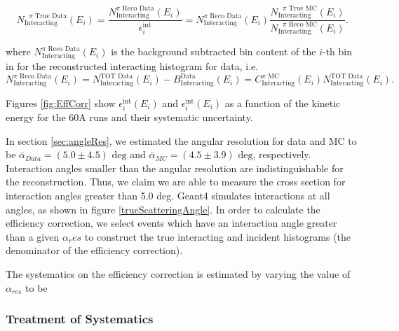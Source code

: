 \begin{equation}
N^{\text{ $\pi$ True Data}}_{\text{Interacting}} (E_{i})  =  \frac{N^{\text{$\pi$ Reco Data}}_{\text{Interacting}} (E_{i})}{\epsilon^{\text{int}}_i} = N^{\text{$\pi$ Reco Data}}_{\text{Interacting}} (E_{i}) \frac{N^{\text{ $\pi$ True MC}}_{\text{Interacting}} (E_{i})}{ N^{\text{ $\pi$ Reco MC}}_{\text{Interacting}} (E_{i})}.
\end{equation}

where $N^{\text{$\pi$ Reco Data}}_{\text{Interacting}} (E_{i})$ is the background subtracted bin content of the $i$-th bin in for the reconstructed interacting histogram for data, i.e. 
\begin{equation}
N^{\text{$\pi$ Reco Data}}_{\text{Interacting}} (E_{i}) =  N^{\text{TOT Data}}_{\text{Interacting}} (E_{i}) - B^{\text{Data}}_{\text{Interacting}} (E_i)  =  C^{\text{$\pi$ MC}}_{\text{Interacting}} (E_{i}) N^{\text{TOT Data}}_{\text{Interacting}} (E_{i}).
\end{equation}

Figures \ref{fig:EffCorr} show $\epsilon^{\text{int}}_i(E_{i})$ and $\epsilon^{\text{int}}_i (E_{i})$ as a function of the kinetic energy for the 60A runs and their systematic uncertainty. 


In section \ref{sec:angleRes}, we estimated the angular resolution for data and MC to be $\bar\alpha_{Data} = (5.0 \pm 4.5) \text{ deg}$  and 
$\bar\alpha_{MC} = (4.5 \pm 3.9) \text{ deg}$, respectively. Interaction angles smaller than the angular resolution are indistinguishable for the reconstruction. Thus, we claim we are able to  measure the cross section for interaction angles greater than 5.0 deg. Geant4 simulates interactions at all angles, as shown in figure \ref{trueScatteringAngle}. In order to calculate the efficiency correction,  we select events which have an interaction angle greater than a given $\alpha_res$ to construct the true interacting and incident histograms (the denominator of the efficiency correction). 

The systematics on the efficiency correction is estimated by varying the value of $\alpha_{res}$ to be 

\subsubsection{Treatment of Systematics}

\clearpage

